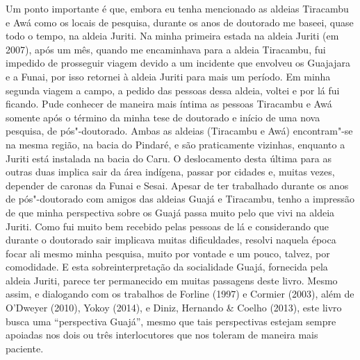 Um ponto importante é que, embora eu tenha mencionado as aldeias
Tiracambu e Awá como os locais de pesquisa, durante os anos de doutorado
me baseei, quase todo o tempo, na aldeia Juriti. Na minha primeira
estada na aldeia Juriti (em 2007), após um mês, quando me encaminhava
para a aldeia Tiracambu, fui impedido de prosseguir viagem devido a um
incidente que envolveu os Guajajara e a Funai, por isso retornei à
aldeia Juriti para mais um período. Em minha segunda viagem a campo, a
pedido das pessoas dessa aldeia, voltei e por lá fui ficando.
Pude conhecer de maneira mais íntima as pessoas Tiracambu e Awá somente
após o término da minha tese de doutorado e início de uma nova pesquisa,
de pós"-doutorado. Ambas as aldeias (Tiracambu e Awá) encontram"-se na
mesma região, na bacia do Pindaré, e são praticamente vizinhas, enquanto
a Juriti está instalada na bacia do Caru. O deslocamento desta última
para as outras duas implica sair da área indígena, passar por cidades e,
muitas vezes, depender de caronas da Funai e Sesai. Apesar de ter
trabalhado durante os anos de pós"-doutorado com amigos das aldeias Guajá
e Tiracambu, tenho a impressão de que minha perspectiva sobre os Guajá
passa muito pelo que vivi na aldeia Juriti. Como fui muito bem recebido
pelas pessoas de lá e considerando que durante o doutorado sair
implicava muitas dificuldades, resolvi naquela época focar ali mesmo
minha pesquisa, muito por vontade e um pouco, talvez, por comodidade. E
esta sobreinterpretação da socialidade Guajá, fornecida pela aldeia
Juriti, parece ter permanecido em muitas passagens deste livro. Mesmo
assim, e dialogando com os trabalhos de Forline (1997) e Cormier (2003),
além de O'Dweyer (2010), Yokoy (2014), e Diniz, Hernando \& Coelho
(2013), este livro busca uma ``perspectiva Guajá'', mesmo que tais
perspectivas estejam sempre apoiadas nos dois ou três interlocutores que
nos toleram de maneira mais paciente.

